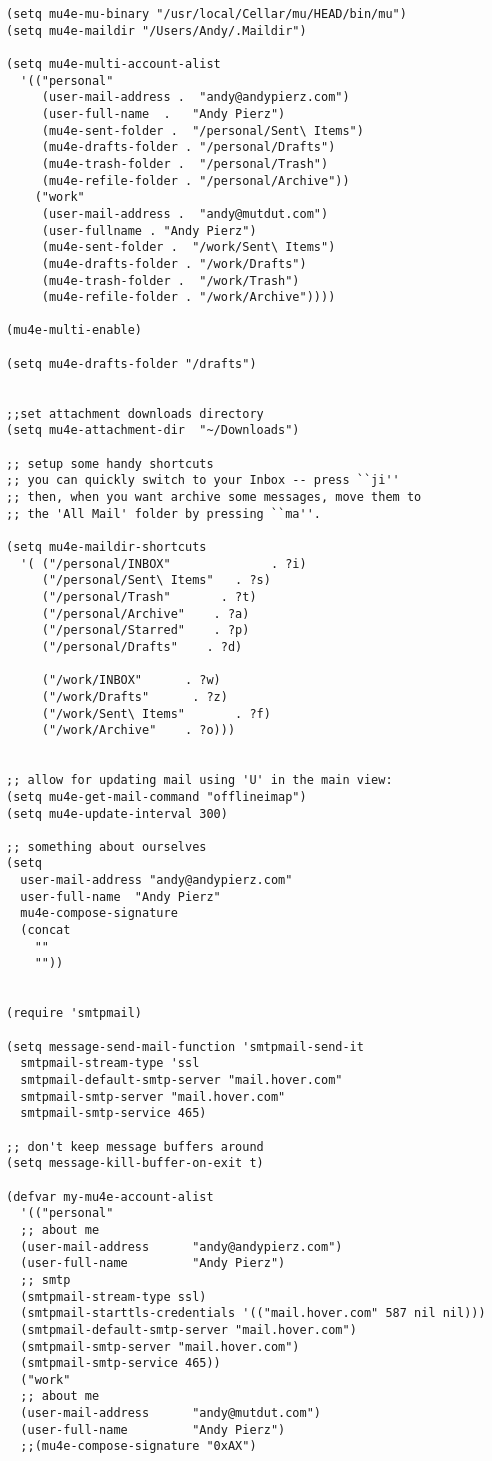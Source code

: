 \documentclass{article}
\begin{document}
\begin{verbatim}
(setq mu4e-mu-binary "/usr/local/Cellar/mu/HEAD/bin/mu")
(setq mu4e-maildir "/Users/Andy/.Maildir")

(setq mu4e-multi-account-alist
  '(("personal"
     (user-mail-address .  "andy@andypierz.com")
     (user-full-name  .   "Andy Pierz")
     (mu4e-sent-folder .  "/personal/Sent\ Items")
     (mu4e-drafts-folder . "/personal/Drafts")
     (mu4e-trash-folder .  "/personal/Trash")
     (mu4e-refile-folder . "/personal/Archive"))
    ("work"
     (user-mail-address .  "andy@mutdut.com")
     (user-fullname . "Andy Pierz")
     (mu4e-sent-folder .  "/work/Sent\ Items")
     (mu4e-drafts-folder . "/work/Drafts")
     (mu4e-trash-folder .  "/work/Trash")
     (mu4e-refile-folder . "/work/Archive"))))

(mu4e-multi-enable)

(setq mu4e-drafts-folder "/drafts")


;;set attachment downloads directory
(setq mu4e-attachment-dir  "~/Downloads")

;; setup some handy shortcuts
;; you can quickly switch to your Inbox -- press ``ji''
;; then, when you want archive some messages, move them to
;; the 'All Mail' folder by pressing ``ma''.

(setq mu4e-maildir-shortcuts
  '( ("/personal/INBOX"              . ?i)
     ("/personal/Sent\ Items"   . ?s)
     ("/personal/Trash"       . ?t)
     ("/personal/Archive"    . ?a)
     ("/personal/Starred"    . ?p)
     ("/personal/Drafts"    . ?d)

     ("/work/INBOX"      . ?w)
     ("/work/Drafts"      . ?z)
     ("/work/Sent\ Items"       . ?f)
     ("/work/Archive"    . ?o)))


;; allow for updating mail using 'U' in the main view:
(setq mu4e-get-mail-command "offlineimap")
(setq mu4e-update-interval 300)

;; something about ourselves
(setq
  user-mail-address "andy@andypierz.com"
  user-full-name  "Andy Pierz"
  mu4e-compose-signature
  (concat
    ""
    ""))


(require 'smtpmail)

(setq message-send-mail-function 'smtpmail-send-it
  smtpmail-stream-type 'ssl
  smtpmail-default-smtp-server "mail.hover.com"
  smtpmail-smtp-server "mail.hover.com"
  smtpmail-smtp-service 465)

;; don't keep message buffers around
(setq message-kill-buffer-on-exit t)

(defvar my-mu4e-account-alist
  '(("personal"
  ;; about me
  (user-mail-address      "andy@andypierz.com")
  (user-full-name         "Andy Pierz")
  ;; smtp
  (smtpmail-stream-type ssl)
  (smtpmail-starttls-credentials '(("mail.hover.com" 587 nil nil)))
  (smtpmail-default-smtp-server "mail.hover.com")
  (smtpmail-smtp-server "mail.hover.com")
  (smtpmail-smtp-service 465))
  ("work"
  ;; about me
  (user-mail-address      "andy@mutdut.com")
  (user-full-name         "Andy Pierz")
  ;;(mu4e-compose-signature "0xAX")


\end{verbatim}
\end{document}
